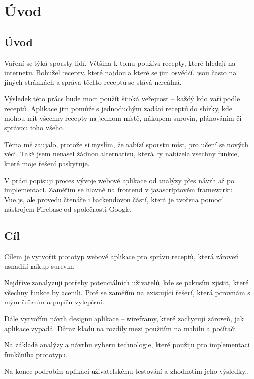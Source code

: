 
\chapter{Úvod}

\section{Úvod}
Vaření se týká spousty lidí. Většina k tomu používá recepty, které hledají na internetu. Bohužel recepty, které najdou
a které se jim osvědčí, jsou často na jiných stránkách a správa těchto receptů se stává nereálná.

Výsledek této práce bude moct použít široká veřejnost -- každý kdo vaří podle receptů. Aplikace jim pomůže s jednoduchým
zadání receptů do sbírky, kde mohou mít všechny recepty na jednom místě, nákupem surovin, plánováním či správou toho všeho.

Téma mě zaujalo, protože si myslím, že nabízí spoustu míst, pro učení se nových věcí. Také jsem nenašel žádnou alternativu,
která by nabízela všechny funkce, které moje řešení poskytuje.

V práci popisuji proces vývoje webové aplikace od analýzy přes návrh až po implementaci. Zaměřím se hlavně na frontend v
javascriptovém frameworku Vue.js, ale provedu čtenáře i backendovou částí, která je tvořena pomocí nástrojem Firebase od
společnosti Google.

\section{Cíl}
Cílem je vytvořit prototyp webové aplikace pro správu receptů, která zároveň usnadňí nákup surovin.

Nejdříve zanalyzuji potřeby potenciálních uživatelů, kde se pokusím zjistit, které všechny funkce by ocenili. Poté se
zaměřím na existující řešení, která porovnám s mým řešením a popíšu vylepšení.

Dále vytvořím návrh designu aplikace -- wireframy, které zachycují zároveň, jak aplikace vypadá. Důraz kladu na rozdíly
mezi použitím na mobilu a počítači.

Na základě analýzy a návrhu vyberu technologie, které použiju pro implementaci funkčního prototypu.

Na konec podrobím aplikaci uživatelskému testování a zhodnotím jeho výsledky..
